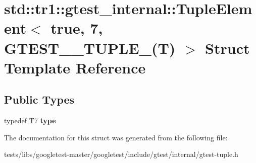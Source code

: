 \hypertarget{structstd_1_1tr1_1_1gtest__internal_1_1TupleElement_3_01true_00_017_00_01GTEST__10__TUPLE___07T_08_01_4}{}\section{std\+:\+:tr1\+:\+:gtest\+\_\+internal\+:\+:Tuple\+Element$<$ true, 7, G\+T\+E\+S\+T\+\_\+\_\+\+T\+U\+P\+L\+E\+\_\+(T) $>$ Struct Template Reference}
\label{structstd_1_1tr1_1_1gtest__internal_1_1TupleElement_3_01true_00_017_00_01GTEST__10__TUPLE___07T_08_01_4}
\subsection*{Public Types}
\begin{DoxyCompactItemize}
\item 
\mbox{\label{structstd_1_1tr1_1_1gtest__internal_1_1TupleElement_3_01true_00_017_00_01GTEST__10__TUPLE___07T_08_01_4_afc625b9bf1ae4c5c51a968134dc9b30a}} 
typedef T7 {\bfseries type}
\end{DoxyCompactItemize}


The documentation for this struct was generated from the following file\+:\begin{DoxyCompactItemize}
\item 
tests/libs/googletest-\/master/googletest/include/gtest/internal/gtest-\/tuple.\+h\end{DoxyCompactItemize}
